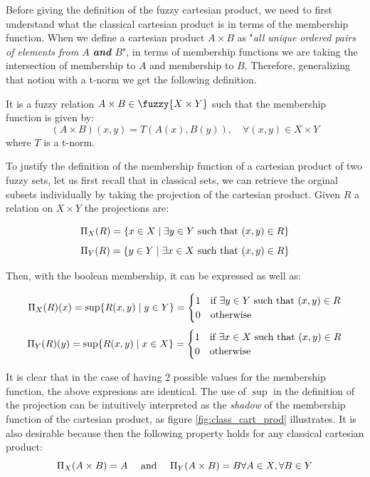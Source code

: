   Before giving the definition of the fuzzy cartesian product, we need to first understand what the classical cartesian product is in terms of the membership function. When we define a cartesian product $A\times B$ as "\textit{all unique ordered pairs of elements from $A$ \textbf{and} $B$}", in terms of membership functions we are taking the intersection of membership to $A$ and membership to $B$. Therefore, generalizing that notion with a t-norm we get the following definition.

  \begin{definition}
    It is a fuzzy relation $A\times B \in \fuzzy{X\times Y}$ such that the membership function is given by:
    \[ 
    (A\times B)(x,y) = T(A(x), B(y)), \quad \forall (x,y) \in X\times Y
    \]
    where $T$ is a t-norm.
  \end{definition}

  To justify the definition of the membership function of a cartesian product of two fuzzy sets, let us first recall that in classical sets, we can retrieve the orginal subsets individually by taking the projection of the cartesian product. Given $R$ a relation on $X\times Y$ the projections are:

  \[\Pi_X(R)=\{x \in X \mid \exists y \in Y \textnormal{ such that } (x,y) \in R\}\]
  \[\Pi_Y(R)=\{y \in Y \mid \exists x \in X \textnormal{ such that } (x,y) \in R\}\]

  Then, with the boolean membership, it can be expressed as well as:

  \[\Pi_X(R)(x)=\sup\{R(x,y) \mid y\in Y\}=
  \begin{cases}
    1 & \textnormal{if } \exists y \in Y \textnormal{ such that } (x,y) \in R \\
    0 & \textnormal{otherwise}
  \end{cases}
  \]
  \[
    \Pi_Y(R)(y)=\sup\{R(x,y) \mid x\in X\}=
    \begin{cases}
      1 & \textnormal{if } \exists x \in X \textnormal{ such that } (x,y) \in R \\
      0 & \textnormal{otherwise}
    \end{cases}
  \]

  It is clear that in the case of having 2 possible values for the membership function, the above expresions are identical. The use of $\sup$ in the definition of the projection can be intuitively interpreted as the \textit{shadow} of the membership function of the cartesian product, as figure \ref{fig:class_cart_prod} illustrates. It is also desirable because then the following property holds for any classical cartesian product:\\
  $$ 
  \Pi_X(A\times B)=A \quad \textnormal{ and } \quad \Pi_Y(A\times B)=B \forall A\in X, \forall B \in Y
  $$

